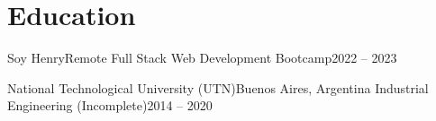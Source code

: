 
\section{Education}
\vspace{3pt}

\resumeSubHeadingListStart

\resumeSubheading
{Soy Henry}{Remote}
{Full Stack Web Development Bootcamp}{2022 -- 2023}
\vspace{6pt}

\resumeSubheading
{National Technological University (UTN)}{Buenos Aires, Argentina}
{Industrial Engineering (Incomplete)}{2014 -- 2020}

\resumeSubHeadingListEnd
\vspace{6pt}
